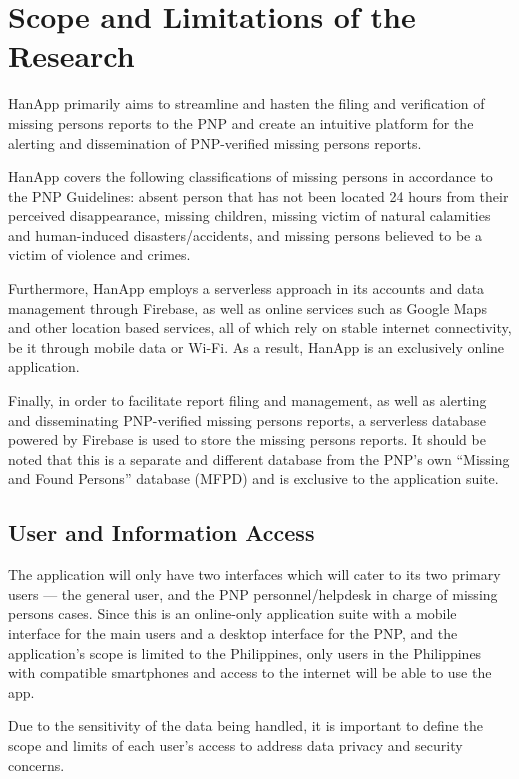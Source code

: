 \section{Scope and Limitations of the Research}
\label{sec:scopelimitations}

HanApp primarily aims to streamline and hasten the filing and verification of missing persons reports to the PNP and create an intuitive platform for the alerting and dissemination of PNP-verified missing persons reports.

HanApp covers the following classifications of missing persons in accordance to the PNP Guidelines: absent person that has not been located 24 hours from their perceived disappearance, missing children, missing victim of natural calamities and human-induced disasters/accidents, and missing persons believed to be a victim of violence and crimes.

Furthermore, HanApp employs a serverless approach in its accounts and data management through Firebase, as well as online services such as Google Maps and other location based services, all of which rely on stable internet connectivity, be it through mobile data or Wi-Fi. As a result, HanApp is an exclusively online application.

Finally, in order to facilitate report filing and management, as well as alerting and disseminating PNP-verified missing persons reports, a serverless database powered by Firebase is used to store the missing persons reports. It should be noted that this is a separate and different database from the PNP’s own “Missing and Found Persons” database (MFPD) and is exclusive to the application suite.

\subsection{User and Information Access}
\label{sec:userInfoAcccess}
The application will only have two interfaces which will cater to its two primary users — the general user, and the PNP personnel/helpdesk in charge of missing persons cases. Since this is an online-only application suite with a mobile interface for the main users and a desktop interface for the PNP, and the application’s scope is limited to the Philippines, only users in the Philippines with compatible smartphones and access to the internet will be able to use the app.

Due to the sensitivity of the data being handled, it is important to define the scope and limits of each user’s access to address data privacy and security concerns.


